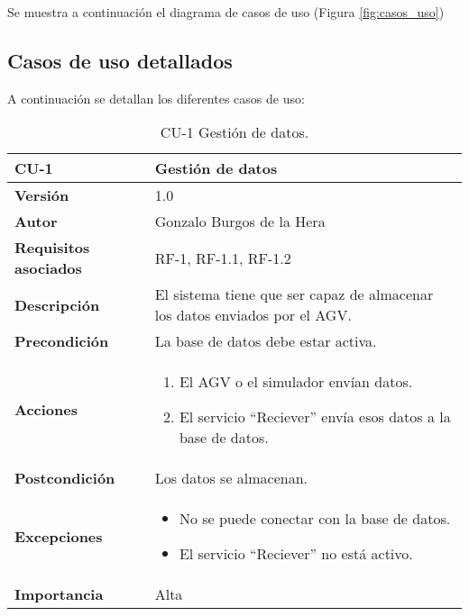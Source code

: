 Se muestra a continuación el diagrama de casos de uso (Figura \ref{fig:casos_uso})


\subsection{Casos de uso detallados}
A continuación se detallan los diferentes casos de uso:

\begin{table}[H]
	\centering
	\begin{tabularx}{\linewidth}{ p{} p{} }
		\toprule
		\textbf{CU-1}    & \textbf{Gestión de datos}\\
		\toprule
		\textbf{Versión}              & 1.0    \\
		\textbf{Autor}                & Gonzalo Burgos de la Hera \\
		\textbf{Requisitos asociados} & RF-1, RF-1.1, RF-1.2 \\
		\textbf{Descripción}          & El sistema tiene que ser capaz de almacenar los datos enviados por el AGV. \\
		\textbf{Precondición}         & La base de datos debe estar activa. \\
		\textbf{Acciones}             &
		\begin{enumerate}
			\def\labelenumi{\arabic{enumi}.}
			\tightlist
			\item El AGV o el simulador envían datos.
			\item El servicio ``Reciever'' envía esos datos a la base de datos.
		\end{enumerate}\\
		\textbf{Postcondición}        & Los datos se almacenan. \\
		\textbf{Excepciones}          & 
        \begin{itemize}
			\tightlist
			\item No se puede conectar con la base de datos.
			\item El servicio ``Reciever'' no está activo.
        \end{itemize} \\
		\textbf{Importancia}          & Alta \\
		\bottomrule
	\end{tabularx}
	\caption{CU-1 Gestión de datos.}
\end{table}

